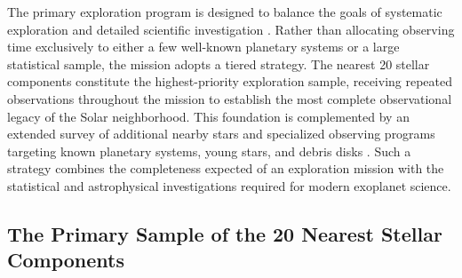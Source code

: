 The primary exploration program is designed to balance the goals of systematic exploration and detailed scientific investigation \cite{LUVOIR2019,HabEx2020}. 
Rather than allocating observing time exclusively to either a few well-known planetary systems or a large statistical sample, the mission adopts a tiered strategy.
The nearest 20 stellar components constitute the highest-priority exploration sample, receiving repeated observations throughout the mission to establish the most complete observational legacy of the Solar neighborhood. This foundation is complemented by an extended survey of additional nearby stars and specialized observing programs targeting known planetary systems, young stars, and debris disks
\cite{LUVOIR2019,HabEx2020}. 
Such a strategy combines the completeness expected of an exploration mission with the statistical and astrophysical investigations required for modern exoplanet science.

\subsection{The Primary Sample of the 20 Nearest Stellar Components}

